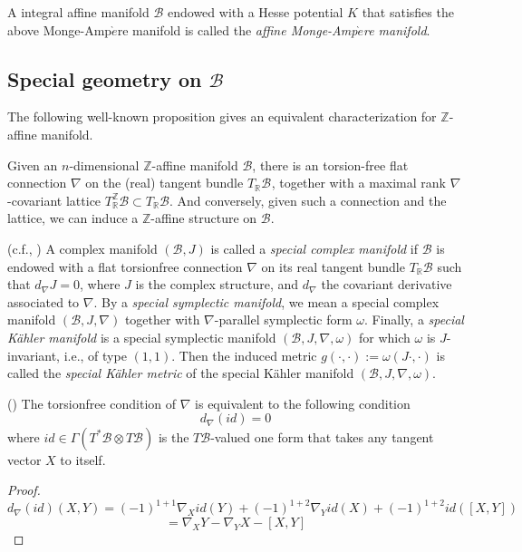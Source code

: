 \documentclass{article}
\begin{document}
\begin{definition}\label{def:2.2}
A integral affine manifold $\mathcal{B}$ endowed with a Hesse potential $K$ that satisfies the above Monge-Amp$\grave{e}$re manifold is called the \textit{affine Monge-Amp$\grave{e}$re manifold}.
\end{definition}

\subsection{Special geometry on \texorpdfstring{$\mathcal{B}$}{lg}}

The following well-known proposition gives an equivalent characterization for $\mathbb{Z}$-affine manifold.

\begin{proposition}\label{pro:2.1}
 Given an $n$-dimensional $\mathbb{Z}$-affine manifold $\mathcal{B}$, there is an torsion-free flat connection $\nabla$ on the (real) tangent bundle $T_{\mathbb{R}}\mathcal{B}^{}$, together with a maximal rank $\nabla$-covariant lattice $T^{\mathbb{Z}}_{\mathbb{R}}\mathcal{B}\subset T_{\mathbb{R}}\mathcal{B}$. And conversely, given such a connection and the lattice, we can induce a $\mathbb{Z}$-affine structure on $\mathcal{B}$.
\end{proposition}

\begin{definition}
(c.f., \cite{freed1999special}\cite{alekseevsky2002special}) A complex manifold $(\mathcal{B},J)$ is called a \textit{special complex manifold} if $\mathcal{B}$ is endowed with a flat torsionfree connection $\nabla$ on its real tangent bundle $T_{\mathbb{R}}\mathcal{B}$ such that $d_{\nabla}J=0$, where $J$ is the complex structure, and $d_{\nabla}$ the covariant derivative associated to $\nabla$. By a \textit{special symplectic manifold}, we mean a special complex manifold $(\mathcal{B},J,\nabla)$ together with $\nabla$-parallel symplectic form $\omega$. Finally, a \textit{special K\"ahler manifold} is a special symplectic manifold $(\mathcal{B},J,\nabla,\omega)$ for which $\omega$ is $J$-invariant, i.e., of type $(1,1)$. Then the induced metric $g(\cdot,\cdot):=\omega(J\cdot,\cdot)$ is called the \textit{special K\"ahler metric} of the special K\"ahler manifold  $(\mathcal{B},J,\nabla,\omega)$.
 \end{definition}

 \begin{lemma}\label{lem:2.2}
 (\cite{freed1999special}) The torsionfree condition of $\nabla$ is equivalent to the following condition\[d_{\nabla}(id)=0\]
 where $id\in\Gamma(T^{*}\mathcal{B}\otimes T\mathcal{B})$ is the $T\mathcal{B}$-valued one form that takes any tangent vector $X$ to itself.
  \end{lemma}
\begin{proof}
 \[d_{\nabla}(id)(X,Y)=(-1)^{1+1}\nabla_{X}id(Y)+(-1)^{1+2}\nabla_{Y}id(X)+(-1)^{1+2}id([X,Y])\]\[=\nabla_{X}Y-\nabla_{Y}X-[X,Y]\]
\end{proof}
 
\end{document}
